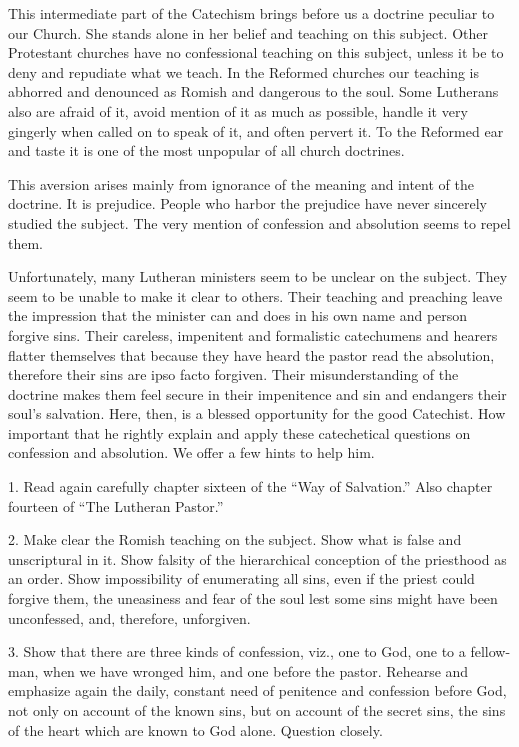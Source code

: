 This intermediate part of the Catechism brings before us a doctrine peculiar to our Church. She stands alone in her belief and teaching on this subject. Other Protestant churches have no confessional teaching on this subject, unless it be to deny and repudiate what we teach. In the Reformed churches our teaching is abhorred and denounced as Romish and dangerous to the soul. Some Lutherans also are afraid of it, avoid mention of it as much as possible, handle it very gingerly when called on to speak of it, and often pervert it. To the Reformed ear and taste it is one of the most unpopular of all church doctrines. 

This aversion arises mainly from ignorance of the meaning and intent of the doctrine. It is prejudice. People who harbor the prejudice have never sincerely studied the subject. The very mention of confession and absolution seems to repel them.

Unfortunately, many Lutheran ministers seem to be unclear on the subject. They seem to be unable to make it clear to others. Their teaching and preaching leave the impression that the minister can and does in his own name and person forgive sins. Their careless, impenitent and formalistic catechumens and hearers flatter themselves that because they have heard the pastor read the absolution, therefore their sins are ipso facto forgiven. Their misunderstanding of the doctrine makes them feel secure in their impenitence and sin and endangers their soul’s salvation. Here, then, is a blessed opportunity for the good Catechist. How important that he rightly explain and apply these catechetical questions on confession and absolution. We offer a few hints to help him. 

1. Read again carefully chapter sixteen of the “Way of Salvation.” Also chapter fourteen of “The Lutheran Pastor.”

2. Make clear the Romish teaching on the subject. Show what is false and unscriptural in it. Show falsity of the hierarchical conception of the priesthood as an order. Show impossibility of enumerating all sins, even if the priest could forgive them, the uneasiness and fear of the soul lest some sins might have been unconfessed, and, therefore, unforgiven. 

3. Show that there are three kinds of confession,
viz., one to God, one to a fellow-man, when we have wronged him, and one before the pastor. Rehearse and emphasize again the daily, constant need of penitence and confession before God, not only on account of the known sins, but on account of the secret sins, the sins of the heart which are known to God alone. Question closely.

